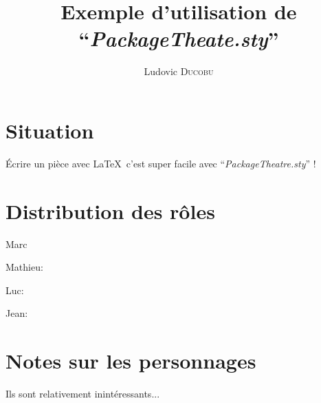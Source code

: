 \documentclass[11pt, a4paper]{report}
\newcommand{\pt}{\textit{PackageTheatre.sty}}
\begin{document}
	\title{Exemple d'utilisation de ``\textit{PackageTheate.sty}''}
	\author{Ludovic \textsc{Ducobu}}
	\date{}
	\maketitle
	\tableofcontents
	
	\section{Situation}
	
	Écrire un pièce avec \LaTeX \ c'est super facile avec ``\pt'' !
	
	\section{Distribution des rôles}
	
	Marc
	\vspace{2mm}
	
	Mathieu:
	\vspace{2mm}
	
	Luc:
	\vspace{2mm}
	
	Jean:
	\vspace{2mm}
	
	\section{Notes sur les personnages}
	
	Ils sont relativement inintéressants...
	
	
\end{document}
